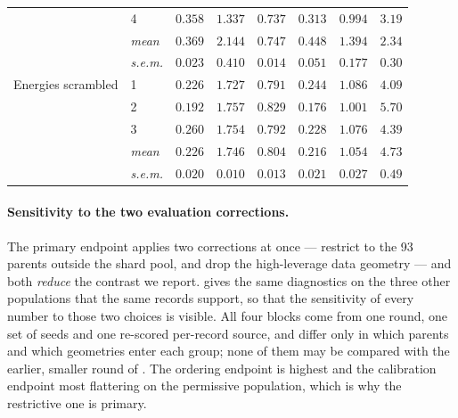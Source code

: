 \begin{table}[h]
\begin{center}
\begin{tabular}{llcccccc}
 & 4 & $0.358$ & $1.337$ & $0.737$ & $0.313$ & $0.994$ & $3.19$ \\
 & \emph{mean} & $0.369$ & $2.144$ & $0.747$ & $0.448$ & $1.394$ & $2.34$ \\
 & \emph{s.e.m.} & $0.023$ & $0.410$ & $0.014$ & $0.051$ & $0.177$ & $0.30$ \\
\midrule
Energies scrambled
 & 1 & $0.226$ & $1.727$ & $0.791$ & $0.244$ & $1.086$ & $4.09$ \\
 & 2 & $0.192$ & $1.757$ & $0.829$ & $0.176$ & $1.001$ & $5.70$ \\
 & 3 & $0.260$ & $1.754$ & $0.792$ & $0.228$ & $1.076$ & $4.39$ \\
 & \emph{mean} & $0.226$ & $1.746$ & $0.804$ & $0.216$ & $1.054$ & $4.73$ \\
 & \emph{s.e.m.} & $0.020$ & $0.010$ & $0.013$ & $0.021$ & $0.027$ & $0.49$ \\
\bottomrule
\end{tabular}
\end{center}
\end{table}

\paragraph{Sensitivity to the two evaluation corrections.} The primary endpoint
applies two corrections at once --- restrict to the 93 parents outside the shard pool,
and drop the high-leverage data geometry --- and both \emph{reduce} the contrast we
report.  gives the same diagnostics on the three other
populations that the same records support, so that the sensitivity of every number to
those two choices is visible. All four blocks come from one round, one set of seeds
and one re-scored per-record source, and differ only in which parents and which
geometries enter each group; none of them may be compared with the earlier, smaller
round of . The ordering endpoint is highest and the calibration
endpoint most flattering on the permissive population, which is why the restrictive
one is primary.

